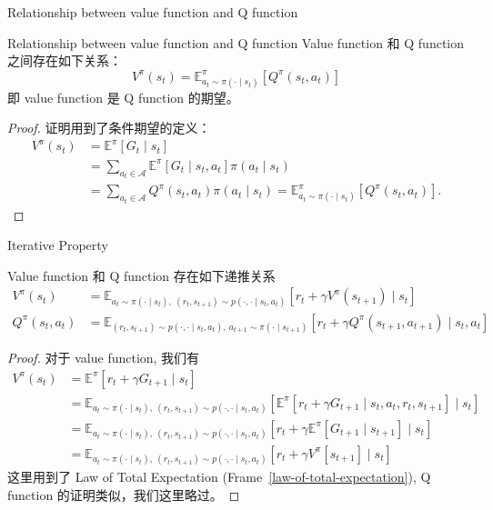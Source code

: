 \documentclass[aspectratio=169]{beamer}
\begin{document}
\begin{frame}{Relationship between value function and Q function}
    \begin{block}{Relationship between value function and Q function}
        Value function 和 Q function 之间存在如下关系：
        \begin{equation}
            V^{\pi}(s_t)  = \mathbb{E}_{a_t\sim \pi(\cdot\mid s_t)}^{\pi}[Q^{\pi}(s_t,a_t)]
        \end{equation}
        即 value function 是 Q function 的期望。
    \end{block}
    \begin{proof}
        证明用到了条件期望的定义：
        \begin{align}
            V^{\pi}(s_t)  &= \mathbb{E}^{\pi}[G_t\mid s_t] \\
            &= \sum_{a_t\in\mathcal{A}}\mathbb{E}^{\pi}\left[G_t\mid s_t, a_t\right]\pi(a_t\mid s_t)\\
            &= \sum_{a_t\in\mathcal{A}}Q^{\pi}(s_t,a_t)\pi(a_t\mid s_t)= \mathbb{E}_{a_t\sim \pi(\cdot\mid s_t)}^{\pi}[Q^{\pi}(s_t,a_t)].
        \end{align}
    \end{proof}
\end{frame}

\begin{frame}{Iterative Property}
    \begin{lemma}\label{lemma:iterative-property}
        Value function 和 Q function 存在如下递推关系
        \begin{align}
            V^\pi(s_t) &= \mathbb{E}_{a_t\sim \pi(\cdot\mid s_t),\ (r_t,s_{t+1})\sim p(\cdot,\cdot\mid s_t,a_t)}[r_t + \gamma V^\pi(s_{t+1})\mid s_t] \label{eq:value-function-iterative-property}\\
            Q^\pi(s_t,a_t) &= \mathbb{E}_{(r_t,s_{t+1})\sim p(\cdot,\cdot\mid s_t,a_t),\ a_{t+1}\sim \pi(\cdot\mid s_{t+1})}[r_t + \gamma Q^\pi(s_{t+1},a_{t+1})\mid s_t,a_t]
        \end{align}
    \end{lemma}
    \begin{proof}
        \small
        对于 value function, 我们有
        \begin{align}
            V^{\pi}(s_t) &= \mathbb{E}^{\pi}[r_t+\gamma G_{t+1}\mid s_t]\\
            &= \mathbb{E}_{a_t\sim \pi(\cdot\mid s_t),\ (r_t,s_{t+1})\sim p(\cdot,\cdot\mid s_t,a_t)}\left[\mathbb{E}^\pi[r_t + \gamma G_{t+1}\mid s_t,a_t,r_t,s_{t+1}]\mid s_t\right]\\
            &= \mathbb{E}_{a_t\sim \pi(\cdot\mid s_t),\ (r_t,s_{t+1})\sim p(\cdot,\cdot\mid s_t,a_t)}\left[r_t + \gamma \mathbb{E}^\pi[G_{t+1}\mid s_{t+1}]\mid s_t\right]\\
            &= \mathbb{E}_{a_t\sim \pi(\cdot\mid s_t),\ (r_t,s_{t+1})\sim p(\cdot,\cdot\mid s_t,a_t)}\left[r_t + \gamma V^\pi[s_{t+1}]\mid s_t\right]
        \end{align}
        这里用到了 Law of Total Expectation (Frame~\ref{law-of-total-expectation}), Q function 的证明类似，我们这里略过。
    \end{proof}
\end{frame}
\end{document}
